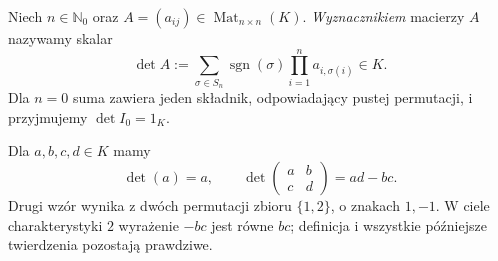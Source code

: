 \begin{definicja}
\label{def:lin6-wyznacznik}
Niech \(n\in\mathbb N_0\) oraz
\(A=(a_{ij})\in\operatorname{Mat}_{n\times n}(K)\).
\emph{Wyznacznikiem} macierzy \(A\)
nazywamy skalar
\[
 \det A :=
 \sum_{\sigma\in S_n}
 \operatorname{sgn}(\sigma)
 \prod_{i=1}^n a_{i,\sigma(i)}
 \in K.
\]
Dla \(n=0\) suma zawiera jeden
składnik, odpowiadający pustej permutacji,
i przyjmujemy \(\det I_0=1_K\).
\end{definicja}

\begin{przyklad}
\label{prz:lin6-male}
Dla \(a,b,c,d\in K\) mamy
\[
 \det(a)=a,\qquad
 \det\begin{pmatrix}a&b\\c&d\end{pmatrix}
 =ad-bc.
\]
Drugi wzór wynika z dwóch permutacji
zbioru \(\{1,2\}\), o znakach \(1,-1\).
W ciele charakterystyki \(2\) wyrażenie
\(-bc\) jest równe \(bc\); definicja
i wszystkie późniejsze twierdzenia
pozostają prawdziwe.
\end{przyklad}

